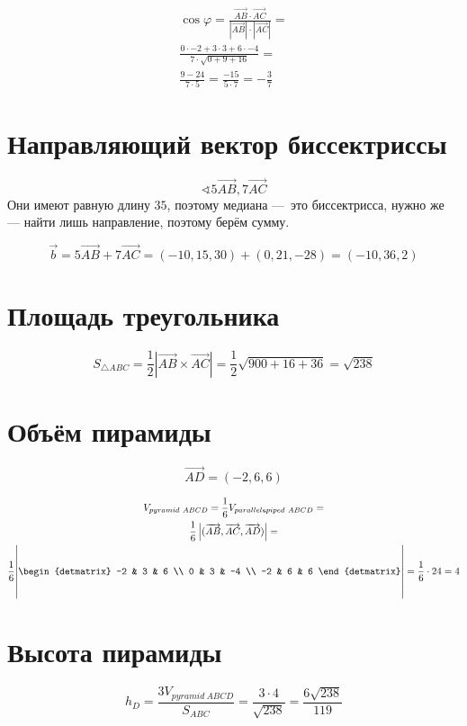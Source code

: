\documentclass[12pt, a4paper]{article}
\begin{document}
    \begin{multline}
        \cos \varphi = \frac{\overrightarrow{AB} \cdot \overrightarrow{AC}}{|\overrightarrow{AB}| \cdot |\overrightarrow{AC}|} = \\
        \frac{0 \cdot -2 + 3 \cdot 3 + 6 \cdot -4}{7 \cdot \sqrt{0 + 9 + 16}} = \\
        \frac{9 - 24}{7 \cdot 5} = \frac{-15}{5 \cdot 7} = -\frac{3}{7}
    \end{multline}

    \section{Направляющий вектор биссектриссы}

    \begin{equation}
        \sphericalangle 5\overrightarrow{AB}, 7\overrightarrow{AC}
    \end{equation}
    Они имеют равную длину $35$, поэтому медиана — это биссектрисса, нужно же — найти лишь направление, поэтому берём сумму.

    \begin{equation}
        \vec{b} = 5\overrightarrow{AB} + 7\overrightarrow{AC} = (-10, 15, 30) + (0, 21, -28) = (-10, 36, 2)
    \end{equation}


    \section{Площадь треугольника}
    
    \begin{equation}
        S_{\triangle ABC} = \frac{1}{2} \left| \overrightarrow{AB} \times \overrightarrow{AC} \right| = \frac{1}{2} \sqrt{900 + 16 + 36} = \sqrt{238}
    \end{equation}


    \section{Объём пирамиды}
    
    \begin{equation}
        \overrightarrow{AD} = (-2, 6, 6)
    \end{equation}

    \begin{multline}
        V_{pyramid ~ ABCD} = \frac{1}{6} V_{parallelepiped ~ ABCD} = \\
        \frac{1}{6} \left|(\overrightarrow{AB}, \overrightarrow{AC}, \overrightarrow{AD})\right| = \\
        \frac{1}{6} \Bigggl|\begin{detmatrix}
            -2 & 3 & 6 \\
            0 & 3 & -4 \\
            -2 & 6 & 6
        \end{detmatrix}\Bigggr| = \frac{1}{6} \cdot 24 = 4
    \end{multline}

    \section{Высота пирамиды}

    \begin{equation}
        h_{D} = \frac{3 V_{pyramid ~ ABCD}}{S_{ABC}} = \frac{3 \cdot 4}{\sqrt{238}} = \frac{6 \sqrt{238}}{119}
    \end{equation}
\end{document}
